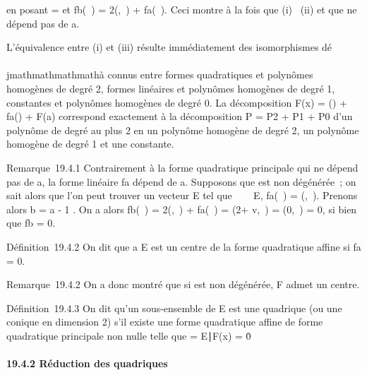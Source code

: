 en posant \Phib = \Phia et
fb(\overrightarrow\xi~) =
2\phia(\overrightarrowab,\overrightarrow\xi~)
+ fa(\overrightarrow\xi~). Ceci montre à la
fois que (i) \rigtharrow~(ii) et que \Phia ne dépend pas de a.

L'équivalence entre (i) et (iii) résulte immédiatement des isomorphismes
dé\\\\jmathmathmathmathà connus entre formes quadratiques et polynômes homogènes de degré 2,
formes linéaires et polynômes homogènes de degré 1, constantes et
polynômes homogènes de degré 0. La décomposition F(x) =
\Phia(\overrightarrowax) +
fa(\overrightarrowax) + F(a) correspond
exactement à la décomposition P = P2 + P1 +
P0 d'un polynôme de degré au plus 2 en un polynôme homogène de
degré 2, un polynôme homogène de degré 1 et une constante.

Remarque~19.4.1 Contrairement à la forme quadratique principale \Phi qui ne
dépend pas de a, la forme linéaire fa dépend de a. Supposons
que \Phi est non dégénérée~; on sait alors que l'on peut trouver un vecteur
\vecv \in\vec E tel que
\forall~\vec\xi~~
\in\vec E, fa(\vec\xi~) =
\phi(\vecv,\vec\xi~). Prenons alors b =
a - 1  \vecv. On a alors
fb(\vec\xi~) =
2\phi(\overrightarrowab,\vec\xi~) +
fa(\vec\xi~) =
\phi(2\overrightarrowab +\vec
v,\vec\xi~) = \phi(0,\vec\xi~) = 0, si
bien que fb = 0.

Définition~19.4.2 On dit que a \in E est un centre de la forme quadratique
affine si fa = 0.

Remarque~19.4.2 On a donc montré que si \Phi est non dégénérée, F admet un
centre.

Définition~19.4.3 On dit qu'un sous-ensemble \Sigma de E est une quadrique
(ou une conique en dimension 2) s'il existe une forme quadratique affine
de forme quadratique principale non nulle telle que \Sigma =
\x \in E∣F(x) =
0\.

\paragraph{19.4.2 Réduction des quadriques}

